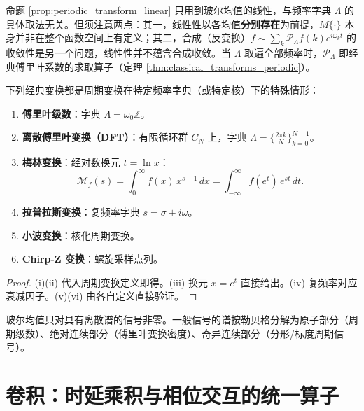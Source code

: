 \begin{remark}[线性性的边界]
命题 \ref{prop:periodic_transform_linear} 只用到玻尔均值的线性，与频率字典 $\Lambda$ 的具体取法无关。但须注意两点：其一，线性性以各均值\textbf{分别存在}为前提，$M\{\cdot\}$ 本身并非在整个函数空间上有定义；其二，合成（反变换）$f \sim \sum_k \mathcal{P}_\Lambda f(k) e^{i\omega_k t}$ 的收敛性是另一个问题，线性性并不蕴含合成收敛。当 $\Lambda$ 取遍全部频率时，$\mathcal{P}_\Lambda$ 即经典傅里叶系数的求取算子（定理 \ref{thm:classical_transforms_periodic}）。
\end{remark}

\begin{theorem}[经典积分变换作为周期变换的特殊情形]\label{thm:classical_transforms_periodic}
下列经典变换都是周期变换在特定频率字典（或特定核）下的特殊情形：
\begin{enumerate}[label=(\roman*)]
    \item \textbf{傅里叶级数}：字典 $\Lambda = \omega_0\mathbb{Z}$。
    \item \textbf{离散傅里叶变换（DFT）}：有限循环群 $C_N$ 上，字典 $\Lambda = \{\frac{2\pi k}{N}\}_{k=0}^{N-1}$。
    \item \textbf{梅林变换}：经对数换元 $t = \ln x$：
    \[
    \mathcal{M}_f(s) = \int_0^\infty f(x)\, x^{s-1}\,dx = \int_{-\infty}^{\infty} f(e^t)\, e^{st}\,dt.
    \]
    \item \textbf{拉普拉斯变换}：复频率字典 $s = \sigma + i\omega$。
    \item \textbf{小波变换}：核化周期变换。
    \item \textbf{Chirp-Z 变换}：螺旋采样点列。
\end{enumerate}
\end{theorem}

\begin{proof}
(i)(ii) 代入周期变换定义即得。(iii) 换元 $x = e^t$ 直接给出。(iv) 复频率对应衰减因子。(v)(vi) 由各自定义直接验证。
\end{proof}

\begin{remark}[离散谱与连续谱]\label{rem:spectrum_decomposition}
玻尔均值只对具有离散谱的信号非零。一般信号的谱按勒贝格分解为原子部分（周期级数）、绝对连续部分（傅里叶变换密度）、奇异连续部分（分形/标度周期信号）。
\end{remark}

\section{\texorpdfstring{卷积：时延乘积与相位交互的统一算子}{卷积}}

